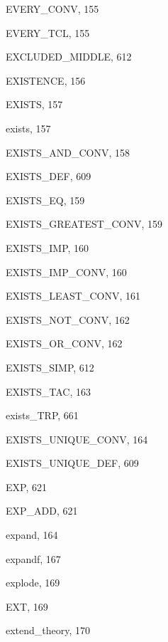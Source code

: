 \begin{theindex}
  \item {\ptt EVERY\_CONV}, 155
  \item {\ptt EVERY\_TCL}, 155
  \item {\ptt EXCLUDED\_MIDDLE}, 612
  \item {\ptt EXISTENCE}, 156
  \item {\ptt EXISTS}, 157
  \item {\ptt exists}, 157
  \item {\ptt EXISTS\_AND\_CONV}, 158
  \item {\ptt EXISTS\_DEF}, 609
  \item {\ptt EXISTS\_EQ}, 159
  \item {\ptt EXISTS\_GREATEST\_CONV}, 159
  \item {\ptt EXISTS\_IMP}, 160
  \item {\ptt EXISTS\_IMP\_CONV}, 160
  \item {\ptt EXISTS\_LEAST\_CONV}, 161
  \item {\ptt EXISTS\_NOT\_CONV}, 162
  \item {\ptt EXISTS\_OR\_CONV}, 162
  \item {\ptt EXISTS\_SIMP}, 612
  \item {\ptt EXISTS\_TAC}, 163
  \item {\ptt exists\_TRP}, 661
  \item {\ptt EXISTS\_UNIQUE\_CONV}, 164
  \item {\ptt EXISTS\_UNIQUE\_DEF}, 609
  \item {\ptt EXP}, 621
  \item {\ptt EXP\_ADD}, 621
  \item {\ptt expand}, 164
  \item {\ptt expandf}, 167
  \item {\ptt explode}, 169
  \item {\ptt EXT}, 169
  \item {\ptt extend\_theory}, 170

  \indexspace


\end{theindex}
